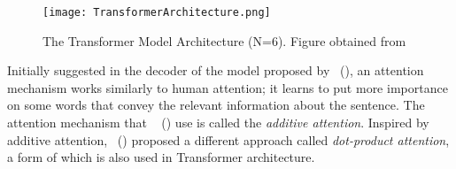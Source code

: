 \begin{figure}
    \centering
    \texttt{[image: TransformerArchitecture.png]}
    \caption[The Transformer Model Architecture]{The Transformer Model Architecture (N=6). Figure obtained from~\parencite{AttentionIsAllYouNeed_Vaswani}}
    \label{fig:transformerArchitecture}
\end{figure}
Initially suggested in the decoder of the model proposed by~\citeauthor{NeuralMachineTranslationByJointlyLearning_Bahdanau} (\citeyear{NeuralMachineTranslationByJointlyLearning_Bahdanau}), an attention mechanism works similarly to human attention; it learns to put more importance on some words that convey the relevant information about the sentence. The attention mechanism that ~\citeauthor{NeuralMachineTranslationByJointlyLearning_Bahdanau} (\citeyear{NeuralMachineTranslationByJointlyLearning_Bahdanau}) use is called the \emph{additive attention}. Inspired by additive attention,~\citeauthor{EffectiveApproachesToAttentionBased_Luong} (\citeyear{EffectiveApproachesToAttentionBased_Luong}) proposed a different approach called \emph{dot-product attention}, a form of which is also used in Transformer architecture.\\
